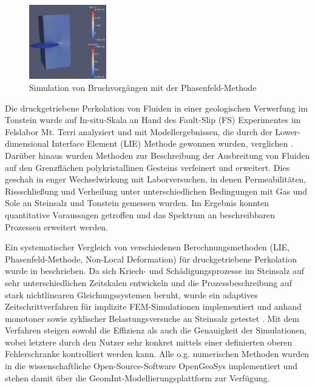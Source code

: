 \begin{figure}
\vspace{-5mm}
\includegraphics[width=0.3\textwidth]{figures/geomint-me3-01a.png}
\caption{Simulation von Bruchvorgängen mit der Phasenfeld-Methode \cite{Yoshioka2020}}
\label{fig:wp2}
\end{figure}
Die druckgetriebene Perkolation von Fluiden in einer geologischen Verwerfung im Tonstein wurde auf In-situ-Skala an Hand des Fault-Slip (FS) Experimentes im Felslabor Mt. Terri analysiert und mit Modellergebnissen, die durch der Lower-dimensional Interface Element (LIE) Methode gewonnen wurden, verglichen \cite{Vowinckel2020}. 
%
Darüber hinaus wurden Methoden zur Beschreibung der Ausbreitung von Fluiden auf den Grenzflächen polykristallinen Gesteins verfeinert und erweitert. Dies geschah in enger Wechselwirkung mit Laborversuchen, in denen Permeabilitäten, Rissschließung und Verheilung unter unterschiedlichen Bedingungen mit Gas und Sole an Steinsalz und Tonstein gemessen wurden. Im Ergebnis konnten quantitative Voraussagen getroffen und das Spektrum an beschreibbaren Prozessen erweitert werden.

Ein systematischer Vergleich von verschiedenen Berechnungsmethoden (LIE, Phasenfeld-Methode, Non-Local Deformation) für druckgetriebene Perkolation wurde in \cite{Yoshioka2019} beschrieben.
%
Da sich Kriech- und Schädigungsprozesse im Steinsalz auf sehr unterschiedlichen Zeitskalen entwickeln und die Prozessbeschreibung auf stark nichtlinearen Gleichungssystemen beruht, wurde ein adaptives Zeitschrittverfahren für implizite FEM-Simulationen implementiert und anhand monotoner sowie zyklischer Belastungsversuche an Steinsalz getestet \cite{Zhang2020}. Mit dem Verfahren steigen sowohl die Effizienz als auch die Genauigkeit der Simulationen, wobei letztere durch den Nutzer sehr konkret mittels einer definierten oberen Fehlerschranke kontrolliert werden kann.
%
Alle o.g. numerischen Methoden wurden in die wissenschaftliche Open-Source-Software OpenGeoSys implementiert und stehen damit über die GeomInt-Modellierungsplattform zur Verfügung.

